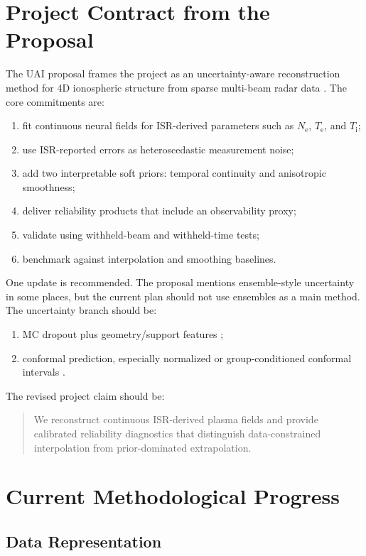 \documentclass[11pt]{article}
\newcommand{\Ne}{N_{\mathrm e}}
\newcommand{\Te}{T_{\mathrm e}}
\newcommand{\Ti}{T_{\mathrm i}}
\begin{document}
\section{Project Contract from the Proposal}

The UAI proposal frames the project as an uncertainty-aware reconstruction method for 4D
ionospheric structure from sparse multi-beam radar data \cite{Diaz2026Proposal}. The core
commitments are:
\begin{enumerate}[leftmargin=*]
  \item fit continuous neural fields for ISR-derived parameters such as $\Ne$, $\Te$, and $\Ti$;
  \item use ISR-reported errors as heteroscedastic measurement noise;
  \item add two interpretable soft priors: temporal continuity and anisotropic smoothness;
  \item deliver reliability products that include an observability proxy;
  \item validate using withheld-beam and withheld-time tests;
  \item benchmark against interpolation and smoothing baselines.
\end{enumerate}

One update is recommended. The proposal mentions ensemble-style uncertainty in some places,
but the current plan should not use ensembles as a main method. The uncertainty branch should be:
\begin{enumerate}[leftmargin=*]
  \item MC dropout plus geometry/support features \cite{Gal2016Dropout,KendallGal2017};
  \item conformal prediction, especially normalized or group-conditioned conformal intervals
  \cite{AngelopoulosBates2021,Romano2019CQR}.
\end{enumerate}

The revised project claim should be:
\begin{quote}
We reconstruct continuous ISR-derived plasma fields and provide calibrated reliability diagnostics
that distinguish data-constrained interpolation from prior-dominated extrapolation.
\end{quote}

\section{Current Methodological Progress}

\subsection{Data Representation}
\end{document}
